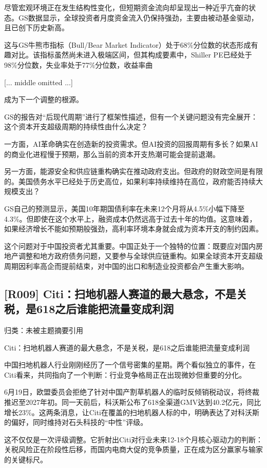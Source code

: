 \documentclass[11pt]{ctexart}
\begin{document}
尽管宏观环境正在发生结构性变化，但短期资金流向却呈现出一种近乎亢奋的状态。GS数据显示，全球投资者月度资金流入仍保持强劲，主要由被动基金驱动，且已创下历史新高。

这与GS牛熊市指标（Bull/Bear Market Indicator）处于68\%分位数的状态形成有趣对比。该指标虽然尚未进入极端区间，但其构成要素中，Shiller PE已经处于98\%分位数，失业率处于77\%分位数，收益率曲

[... middle omitted ...]

成为下一个调整的根源。

GS的报告对“后现代周期”进行了框架性描述，但有一个关键问题没有完全展开：这个资本开支超级周期的持续性由什么决定？

一方面，AI革命确实在创造新的投资需求。但AI投资的回报周期有多长？如果AI的商业化进程慢于预期，那么当前的资本开支热潮可能会提前退潮。

另一方面，能源安全和供应链重构确实在推动政府支出。但政府的财政空间是有限的。美国债务水平已经处于历史高位，如果利率持续维持在高位，政府能否持续大规模支出？

GS自己的预测显示，美国10年期国债利率在未来12个月将从4.5\%小幅下降至4.3\%。但即使在这个水平上，融资成本仍然远高于过去十年的均值。这意味着，如果经济增长不能如预期般强劲，高利率环境本身就会成为资本开支的制约因素。

这个问题对于中国投资者尤其重要。中国正处于一个独特的位置：既要应对国内房地产调整和地方政府债务问题，又要参与全球供应链重构。如果全球资本开支超级周期因利率高企而提前结束，对中国的出口和制造业投资都会产生重大影响。

\subsection{[R009] Citi：扫地机器人赛道的最大悬念，不是关税，是618之后谁能把流量变成利润}
{\small\color{refgray}归类：未被主题摘要引用}

Citi：扫地机器人赛道的最大悬念，不是关税，是618之后谁能把流量变成利润

中国扫地机器人行业刚刚经历了一个信号密集的星期。两个看似独立的事件，在Citi看来，共同指向了一个判断：行业竞争格局正在出现微妙但重要的分化。

6月19日，欧盟委员会拒绝了针对中国产割草机器人的临时反倾销税动议，将终裁推迟至2027年初。同一天前后，科沃斯公布了618全渠道GMV达到40.2亿元，同比增长23\%。这两条消息，让Citi在覆盖的扫地机器人标的中，明确表达了对科沃斯的偏好，同时维持对石头科技的“中性”评级。

这不仅仅是一次评级调整。它折射出Citi对行业未来12-18个月核心驱动力的判断：关税风险正在阶段性后移，而国内电商大促的竞争质量，正在成为区分赢家与输家的关键标尺。
\end{document}
